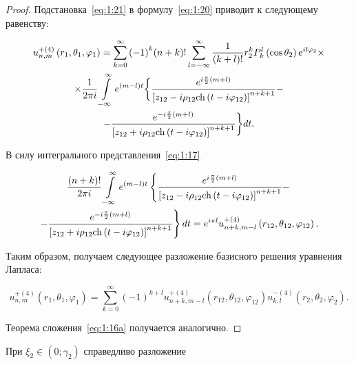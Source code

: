 \begin{russian}
\begin{proof}
Подстановка~\eqref{eq:1:21} в формулу~\eqref{eq:1:20} приводит к следующему равенству:

\begin{multline*}
u_{n,m}^{ + (4)}\left( {{r_1},{\theta _1},{\varphi _1}} \right) = \sum\limits_{k = 0}^\infty  {{{( - 1)}^k}} (n + k)!\sum\limits_{l =  - \infty }^\infty  {\frac{1}{{(k + l)!}}} r_2^kP_k^l\left( {\cos {\theta _2}} \right){e^{il{\varphi _2}}} \times \\
\times \frac{1}{{2\pi i}}\int\limits_{ - \infty }^\infty  {{e^{(m - l)t}}} \bigg\{ \frac{{{e^{i\frac{\pi }{2}(m + l)}}}}{{{{\left[ {{z_{12}} - i{\rho _{12}}{\mathop{\rm ch}\nolimits} \left( {t - i{\varphi _{12}}} \right)} \right]}^{n + k + 1}}}} - \\
- \frac{{{e^{ - i\frac{\pi }{2}(m + l)}}}}{{{{\left[ {{z_{12}} + i{\rho _{12}}{\mathop{\rm ch}\nolimits} \left( {t - i{\varphi _{12}}} \right)} \right]}^{n + k + 1}}}} \bigg\}dt.
\end{multline*}

В силу интегрального представления~\eqref{eq:1:17}

\begin{multline*}
\frac{{(n + k)!}}{{2\pi i}}\int\limits_{ - \infty }^\infty  {{e^{(m - l)t}}} \left\{ \frac{{{e^{i\frac{\pi }{2}(m + l)}}}}{{{{\left[ {{z_{12}} - i{\rho _{12}}{\mathop{\rm ch}\nolimits} \left( {t - i{\varphi _{12}}} \right)} \right]}^{n + k + 1}}}} - \right.\\
\left. - \frac{{{e^{ - i\frac{\pi }{2}(m + l)}}}}{{{{\left[ {{z_{12}} + i{\rho _{12}}{\mathop{\rm ch}\nolimits} \left( {t - i{\varphi _{12}}} \right)} \right]}^{n + k + 1}}}} \right\}dt =
{e^{i\pi l}}u_{n + k,m - l}^{ + (4)}\left( {{r_{12}},{\theta _{12}},{\varphi _{12}}} \right).
\end{multline*}

Таким образом, получаем следующее разложение базисного решения уравнения Лапласа:

\[u_{n,m}^{ + (4)}\left( {{r_1},{\theta _1},{\varphi _1}} \right) = \sum\limits_{k = 0}^\infty  {{{( - 1)}^{k + l}}} u_{n + k,m - l}^{ + (4)}\left( {{r_{12}},{\theta _{12}},{\varphi _{12}}} \right)u_{k,l}^{ - (4)}\left( {{r_2},{\theta _2},{\varphi _2}} \right).\]

Теорема сложения~\eqref{eq:1:16a} получается аналогично.
\end{proof}

\begin{theorem}
При ${\xi _2} \in \left( {0;{\gamma _2}} \right)$ справедливо разложение


\end{theorem}
\end{russian}
